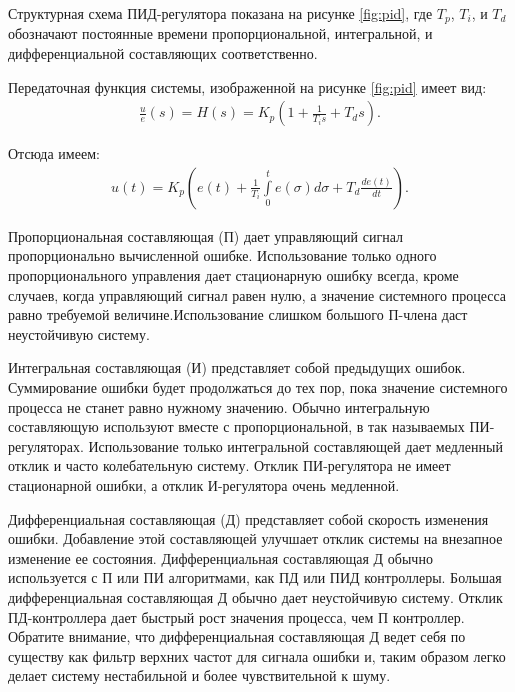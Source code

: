         Структурная схема ПИД-регулятора показана на рисунке \ref{fig:pid}, где
        $T_p$, $T_i$, и $T_d$ обозначают постоянные времени пропорциональной,
        интегральной, и дифференциальной составляющих соответственно.

        Передаточная функция системы, изображенной на рисунке \ref{fig:pid}
        имеет вид:
        \begin{gather*}
            \frac{u}{e}(s) = H(s) = K_p \left(1 + \frac{1}{T_i s} + T_d s\right).
        \end{gather*}

        Отсюда имеем:
        \begin{gather*}
            u(t) = K_p \left( e(t)+\frac{1}{T_i} 
                \int \limits_0^t e(\sigma)d \sigma + T_d \frac{de(t)}{dt} \right).
        \end{gather*}

        Пропорциональная составляющая (П) дает управляющий сигнал
        пропорционально вычисленной ошибке. Использование только одного
        пропорционального управления дает стационарную ошибку всегда, кроме
        случаев, когда управляющий сигнал равен нулю, а значение системного
        процесса равно требуемой величине.Использование слишком большого
        П-члена даст неустойчивую систему. 

        Интегральная составляющая (И) представляет собой предыдущих ошибок.
        Суммирование ошибки будет продолжаться до тех пор, пока значение
        системного процесса не станет равно нужному значению. Обычно
        интегральную составляющую используют вместе с пропорциональной, в так
        называемых ПИ-регуляторах. Использование только интегральной
        составляющей дает медленный отклик и часто колебательную систему.
        Отклик ПИ-регулятора не имеет стационарной ошибки, а отклик
        И-регулятора очень медленной.

        Дифференциальная составляющая (Д) представляет собой скорость изменения
        ошибки. Добавление этой составляющей улучшает отклик системы на
        внезапное изменение ее состояния. Дифференциальная составляющая Д
        обычно используется с П или ПИ алгоритмами, как ПД или ПИД контроллеры.
        Большая дифференциальная составляющая Д обычно дает неустойчивую
        систему. Отклик ПД-контроллера дает быстрый рост значения процесса, чем
        П контроллер. Обратите внимание, что дифференциальная составляющая Д
        ведет себя по существу как фильтр верхних частот для сигнала ошибки и,
        таким образом легко делает систему нестабильной и более чувствительной
        к шуму.

